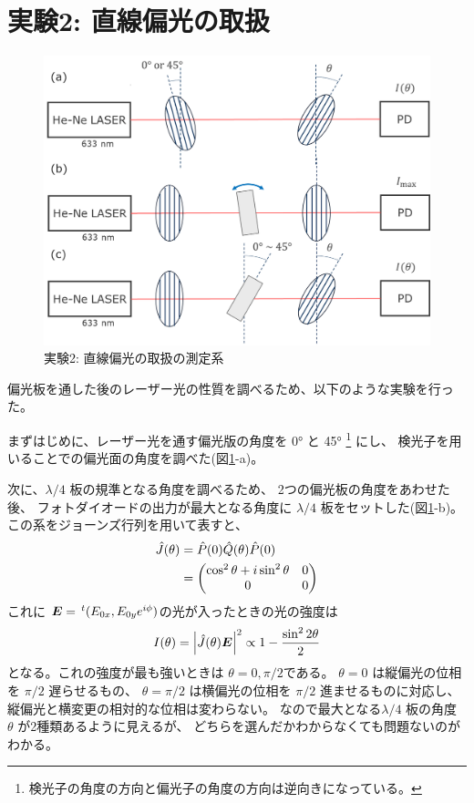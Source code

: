 \documentclass[9pt,dvipdfmx,a4paper]{jsarticle}
\begin{document}
\clearpage
\section{実験2: 直線偏光の取扱}
\begin{figure}
    \centering
    \includegraphics[width=0.48\columnwidth]{fig_ex-2.png}
    \caption{実験2: 直線偏光の取扱の測定系}
    \label{fig:ex-2}
\end{figure}
偏光板を通した後のレーザー光の性質を調べるため、以下のような実験を行った。

まずはじめに、レーザー光を通す偏光版の角度を \ang{0} と \ang{45}
\footnote{検光子の角度の方向と偏光子の角度の方向は逆向きになっている。} にし、
検光子を用いることでの偏光面の角度を調べた(図\ref{fig:ex-2}-a)。

次に、\(\lambda/4\) 板の規準となる角度を調べるため、
2つの偏光板の角度をあわせた後、
フォトダイオードの出力が最大となる角度に \(\lambda/4\) 板をセットした(図\ref{fig:ex-2}-b)。
この系をジョーンズ行列を用いて表すと、
\begin{align}
    \hat{J}(\theta) &= \hat{P}(0)\hat{Q}(\theta)\hat{P}(0) \notag\\
    &=\begin{pmatrix}
        \cos^2\theta + i\sin^2\theta  & 0\\
        0 & 0
    \end{pmatrix}
\end{align}
これに \(\vb*{E}=\,^t(E_{0x},E_{0y}e^{i\phi})\)の光が入ったときの光の強度は %
\begin{align}
    I(\theta) = \abs{\hat{J}(\theta)\vb*{E}}^2 \propto 1 -\frac{\sin^2 2\theta}{2}
\end{align}
となる。これの強度が最も強いときは \(\theta=0,\pi/2\)である。
\(\theta=0\) は縦偏光の位相を \(\pi/2\) 遅らせるもの、
\(\theta=\pi/2\) は横偏光の位相を \(\pi/2\) 進ませるものに対応し、
縦偏光と横変更の相対的な位相は変わらない。
なので最大となる\(\lambda/4\) 板の角度 \(\theta\) が2種類あるように見えるが、
どちらを選んだかわからなくても問題ないのがわかる。
\end{document}
